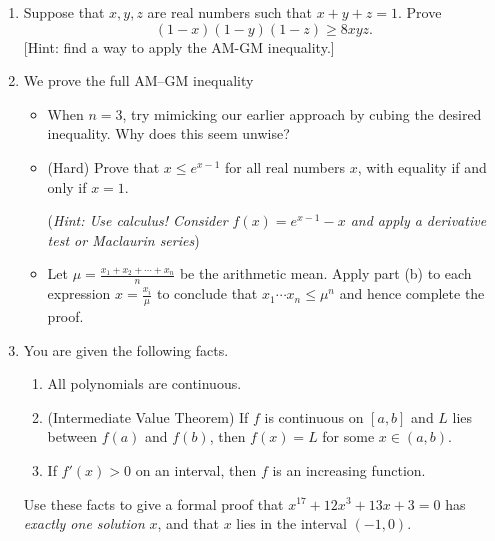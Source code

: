 \begin{exercises}{}{}
\begin{enumerate}
	\item Suppose that $x,y,z$ are real numbers such that $x + y + z = 1$. Prove
    \[  
        (1 - x)(1 - y)(1 - z) \geq 8 xyz.
    \]
    [Hint: find a way to apply the AM-GM inequality.]
    
    
    

	\item\label{exs:amgm-full} We prove the full AM--GM inequality
\begin{itemize}
  \item When $n=3$, try mimicking our earlier approach by cubing the desired inequality. Why does this seem unwise?
	\item (Hard) Prove that $x\le e^{x-1}$ for all real numbers $x$, with equality if and only if $x=1$.\par
	(\emph{Hint: Use calculus! Consider $f(x)=e^{x-1}-x$ and apply a derivative test or Maclaurin series})
	\item Let $\mu=\frac{x_1+x_2+\cdots +x_n}{n}$ be the arithmetic mean. Apply part (b) to each expression $x=\frac{x_i}\mu$ to conclude that $x_1\cdots x_n\le \mu^n$ and hence complete the proof.
\end{itemize}
	
  \item You are given the following facts.
  \begin{enumerate}
    \item All polynomials are continuous.
    \item (Intermediate Value Theorem) If $f$ is continuous on $[a,b]$ and $L$ lies between $f(a)$ and $f(b)$, then $f(x)=L$ for some $x\in(a,b)$.
    \item If $f'(x)>0$ on an interval, then $f$ is an increasing function.
	\end{enumerate}
	Use these facts to give a formal proof that $x^{17}+12x^3+13x+3=0$ has \emph{exactly one solution} $x$, and that $x$ lies in the interval $(-1,0)$.
	

\end{enumerate}
\end{exercises}

